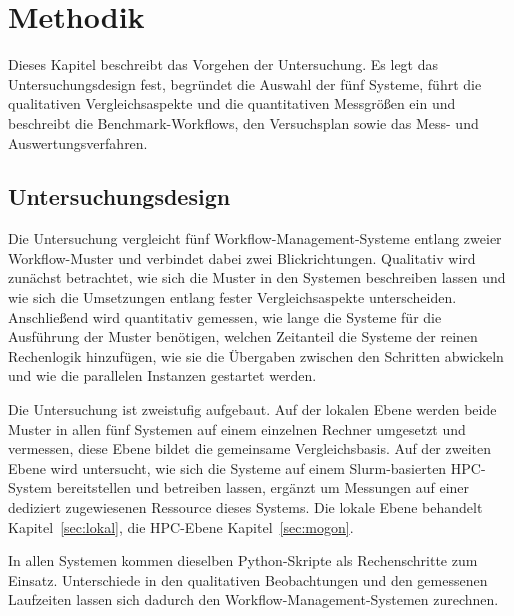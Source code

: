 
\lstset{breaklines=true, breakatwhitespace=false}

\chapter{Methodik}
\label{sec:methodik}

Dieses Kapitel beschreibt das Vorgehen der Untersuchung. Es legt das
Untersuchungsdesign fest, begründet die Auswahl der fünf Systeme,
führt die qualitativen Vergleichsaspekte und die quantitativen
Messgrößen ein und beschreibt die Benchmark-Workflows, den
Versuchsplan sowie das Mess- und Auswertungsverfahren.

\section{Untersuchungsdesign}
\label{sec:methodik:design}

Die Untersuchung vergleicht fünf Workflow-Management-Systeme entlang
zweier Workflow-Muster und verbindet dabei zwei Blickrichtungen.
Qualitativ wird zunächst betrachtet, wie sich die Muster in den
Systemen beschreiben lassen und wie sich die Umsetzungen entlang
fester Vergleichsaspekte unterscheiden. Anschließend wird
quantitativ gemessen, wie lange die Systeme für die Ausführung der
Muster benötigen, welchen Zeitanteil die Systeme der reinen
Rechenlogik hinzufügen, wie sie die Übergaben zwischen den Schritten
abwickeln und wie die parallelen Instanzen gestartet werden.

Die Untersuchung ist zweistufig aufgebaut. Auf der lokalen Ebene
werden beide Muster in allen fünf Systemen auf einem einzelnen
Rechner umgesetzt und vermessen, diese Ebene bildet die gemeinsame
Vergleichsbasis. Auf der zweiten Ebene wird untersucht, wie sich die
Systeme auf einem Slurm-basierten HPC-System bereitstellen und
betreiben lassen, ergänzt um Messungen auf einer dediziert
zugewiesenen Ressource dieses Systems. Die lokale Ebene behandelt
Kapitel~\ref{sec:lokal}, die HPC-Ebene Kapitel~\ref{sec:mogon}.

In allen Systemen kommen dieselben Python-Skripte als Rechenschritte
zum Einsatz. Unterschiede in den qualitativen Beobachtungen und den gemessenen Laufzeiten lassen sich dadurch den Workflow-Management-Systemen zurechnen.

